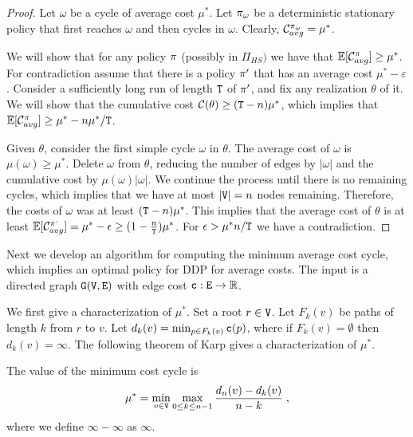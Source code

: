 \begin{proof}
Let $\omega$ be a cycle of average cost $\mu^*$. Let
$\pi_{\omega}$ be a deterministic stationary policy that first
reaches $\omega$ and then cycles in $\omega$. Clearly,
$\mathcal{C}^{\pi_\omega}_{avg}=\mu^*$.

We will show that for any policy $\pi$ (possibly in $\Pi_{HS})$ we
have that $\mathbb{E}[\mathcal{C}^\pi_{avg}]\geq \mu^*$. For contradiction
assume that there is a policy $\pi'$ that has an average cost
$\mu^*-\varepsilon$. Consider a sufficiently long run of length
${\tt T}$ of $\pi'$, and fix any realization $\theta$ of it.
We will show that the cumulative cost $\mathcal{C}(\theta)\geq
({\tt T}-n)\mu^*$, which implies that $\mathbb{E}[\mathcal{C}^\pi_{avg}]\geq
\mu^* -n\mu^*/{\tt T}$.

Given $\theta$, consider the first simple cycle $\omega$ in
$\theta$. The average cost of $\omega$ is $\mu(\omega)\geq\mu^*$.
Delete $\omega$ from $\theta$, reducing the number of edges by
$|\omega|$ and the cumulative cost by $\mu(\omega)|\omega|$. We
continue the process until there is no remaining cycles, which
implies that we have at most $|{\tt V}|=n$ nodes remaining. Therefore, the
costs of $\omega$ was at least $({\tt T}-n)\mu^*$. This implies
that the average cost of $\theta$ is at least $\mathbb{E}[\mathcal{C}_{avg}^{\pi^{,}}]=\mu^*-\epsilon\geq
(1-\frac{n}{{\tt T}})\mu^*$. For $\epsilon>\mu^* n/{\tt T}$ we
have a contradiction.
\end{proof}

Next we develop an algorithm for computing the minimum average cost
cycle, which implies an optimal policy for DDP for average costs.
The input is a directed graph ${\tt G}({\tt V},{\tt E})$ with edge cost ${\tt c}:{\tt E}\rightarrow {\mathbb R}$.

We first give a characterization of $\mu^*$. Set a root $r\in {\tt V}$.
Let $F_{k}(v)$ be paths of length $k$ from $r$ to $v$. Let
$d_{k}(v)=\min_{p\in F_{k}(v)} {\tt c}(p)$, where if
$F_{k}(v)=\emptyset$ then $d_{k}(v)=\infty$. The following theorem of Karp \cite{Karp78}
gives a characterization of $\mu^*$.

\begin{theorem}
The value of the minimum cost cycle is
\[
\mu^*=\min_{v\in {\tt V}} \max_{0\leq k \leq n-1}
\frac{d_n(v)-d_{k}(v)}{n-k}\;,
\]
where we define $\infty-\infty$ as $\infty$.
\end{theorem}

